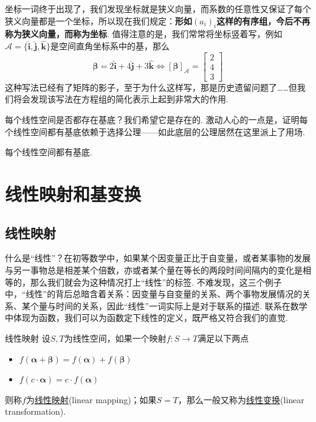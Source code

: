 \documentclass[main.tex]{subfiles}
\begin{document}
坐标一词终于出现了，我们发现坐标就是狭义向量，而系数的任意性又保证了每个狭义向量都是一个坐标，所以现在我们规定：\textbf{形如\((a_i)_i\)这样的有序组，今后不再称为狭义向量，而称为坐标}. 值得注意的是，我们常常将坐标竖着写，例如\(\mathcal A = \{\bm{\hat i}, \bm{\hat j}, \bm{\hat k}\}\)是空间直角坐标系中的基，那么
\[\bm\beta = 2\bm{\hat i} + 4\bm{\hat j} + 3\bm{\hat k} \Longleftrightarrow [\bm\beta]_\mathcal{A} = \begin{bmatrix} 2 \\ 4 \\ 3 \end{bmatrix}\]
这种写法已经有了矩阵的影子，至于为什么这样写，那是历史遗留问题了……但我们将会发现该写法在方程组的简化表示上起到非常大的作用.

每个线性空间是否都存在基底？我们希望它是存在的. 激动人心的一点是，证明每个线性空间都有基底依赖于选择公理——如此底层的公理居然在这里派上了用场.

\begin{proposition}{}
    每个线性空间都有基底.
\end{proposition}

\section{线性映射和基变换}


\subsection{线性映射}

什么是“线性”？在初等数学中，如果某个因变量正比于自变量，或者某事物的发展与另一事物总是相差某个倍数，亦或者某个量在等长的两段时间间隔内的变化是相等的，那么我们就会为这种情况打上“线性”的标签. 不难发现，这三个例子中，“线性”的背后总暗含着关系：因变量与自变量的关系、两个事物发展情况的关系、某个量与时间的关系，因此“线性”一词实际上是对于联系的描述. 联系在数学中体现为函数，我们可以为函数定下线性的定义，既严格又符合我们的直觉.

\begin{definition}{线性映射}
    设\(S,T\)为线性空间，如果一个映射\(f:S \to T\)满足以下两点
    \begin{itemize}
        \item [(1)] \(f(\bm\alpha+\bm\beta) = f(\bm\alpha)+f(\bm\beta)\)
        \item [(2)] \( f(c\cdot\bm\alpha) = c\cdot f(\bm\alpha)\)
    \end{itemize}
    则称\(f\)为\uline{线性映射}(linear mapping)；如果\(S=T\)，那么一般又称为\uline{线性变换}(linear transformation).
\end{definition}
\end{document}
